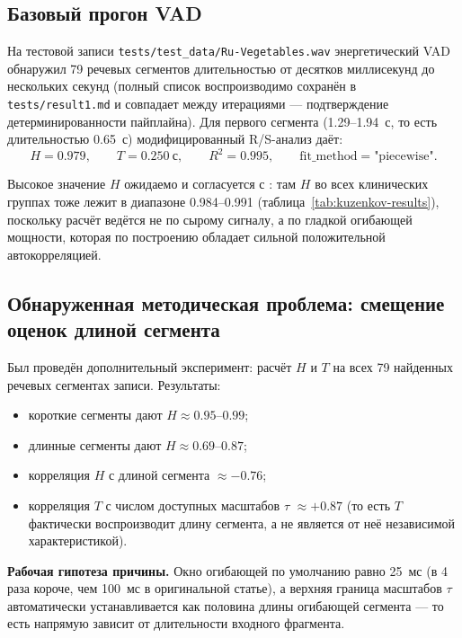 \documentclass[12pt,a4paper]{article}
\begin{document}
\subsection{Базовый прогон VAD}

На тестовой записи \texttt{tests/test\_data/Ru-Vegetables.wav} энергетический
VAD обнаружил 79 речевых сегментов длительностью от десятков миллисекунд до
нескольких секунд (полный список воспроизводимо сохранён в
\texttt{tests/result1.md} и совпадает между итерациями — подтверждение
детерминированности пайплайна). Для первого сегмента (1.29--1.94~с, то есть
длительностью 0.65~с) модифицированный R/S-анализ даёт:
\[
H = 0.979, \qquad T = 0.250\ \text{с}, \qquad R^2 = 0.995,
\qquad \text{fit\_method} = \text{"piecewise"}.
\]

Высокое значение $H$ ожидаемо и согласуется с \cite{kuzenkov2014}: там
$H$ во всех клинических группах тоже лежит в диапазоне 0.984--0.991
(таблица~\ref{tab:kuzenkov-results}), поскольку расчёт ведётся не по
сырому сигналу, а по гладкой огибающей мощности, которая по построению
обладает сильной положительной автокорреляцией.

\subsection{Обнаруженная методическая проблема: смещение оценок длиной
сегмента}

Был проведён дополнительный эксперимент: расчёт $H$ и $T$ на всех 79 найденных
речевых сегментах записи. Результаты:

\begin{itemize}
  \item короткие сегменты дают $H \approx 0.95$--$0.99$;
  \item длинные сегменты дают $H \approx 0.69$--$0.87$;
  \item корреляция $H$ с длиной сегмента $\approx -0.76$;
  \item корреляция $T$ с числом доступных масштабов $\tau$
   $\approx +0.87$ (то есть $T$ фактически воспроизводит длину сегмента, а
   не является от неё независимой характеристикой).
\end{itemize}

\textbf{Рабочая гипотеза причины.} Окно огибающей по умолчанию равно 25~мс
(в 4 раза короче, чем 100~мс в оригинальной статье), а верхняя граница
масштабов $\tau$ автоматически устанавливается как половина длины огибающей
сегмента — то есть напрямую зависит от длительности входного фрагмента.
\end{document}
